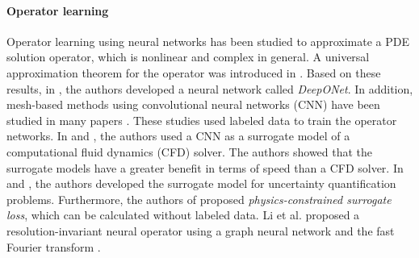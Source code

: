 \documentclass[letterpaper]{article}
\begin{document}
\paragraph{Operator learning}
Operator learning using neural networks has been studied to approximate a PDE solution operator, which is nonlinear and complex in general. A universal approximation theorem for the operator was introduced in \cite{chen1993approximations}. Based on these results, in \cite{lu2019deeponet}, the authors developed a neural network called \textit{DeepONet}. In addition, mesh-based methods using convolutional neural networks (CNN) have been studied in many papers \cite{bhatnagar2019prediction, guo2016convolutional, khoo2017solving, zhu2018bayesian}. These studies used labeled data to train the operator networks. In \cite{bhatnagar2019prediction} and \cite{guo2016convolutional}, the authors used a CNN as a surrogate model of a computational fluid dynamics (CFD) solver. The authors showed that the surrogate models have a greater benefit in terms of speed than a CFD solver. In \cite{khoo2017solving} and \cite{zhu2018bayesian}, the authors developed the surrogate model for uncertainty quantification problems. Furthermore, the authors of \cite{zhu2019physics} proposed \textit{physics-constrained surrogate loss}, which can be calculated without labeled data. Li et al. proposed a resolution-invariant neural operator using a graph neural network \cite{li2020neural} and the fast Fourier transform \cite{li2020fourier}.
\end{document}
